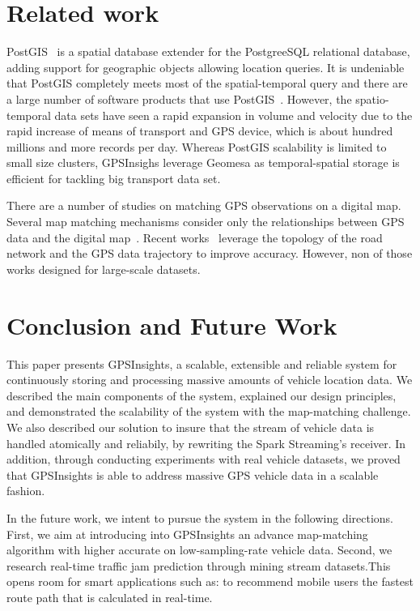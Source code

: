 \documentclass{acm_proc_article-sp}
\begin{document}
\section{Related work}

PostGIS~\cite{posgis} is a spatial database extender for the PostgreeSQL relational database, adding support for geographic objects allowing location queries. It is undeniable that PostGIS completely meets most of the spatial-temporal query and there are a large number of software products that use PostGIS~\cite{backendposgis}. However, the spatio-temporal data sets have seen a rapid expansion in volume and velocity due to the rapid increase of means of transport and GPS device, which is about hundred millions and more records per day. Whereas PostGIS scalability is limited to small size clusters, GPSInsighs leverage Geomesa as temporal-spatial storage is efficient for tackling big transport data set.

There are a number of studies on matching GPS observations on a digital map. Several map matching mechanisms consider only the relationships between GPS data and the digital map~\cite{noh1998map}. Recent works~\cite{yang2005map} leverage the topology of the road network and the GPS data trajectory to improve accuracy. However, non of those works designed for large-scale datasets.  

\section{Conclusion and Future Work}

This paper presents GPSInsights, a scalable, extensible and reliable system for continuously storing and processing massive amounts of vehicle location data. We described the main components of the system, explained our design principles, and demonstrated the scalability of the system with the map-matching challenge. We also described our solution to insure that the stream of vehicle data is handled atomically and reliabily, by rewriting the Spark Streaming's receiver. In addition, through conducting experiments with real vehicle datasets, we proved that GPSInsights is able to address massive GPS vehicle data in a scalable fashion.

In the future work, we intent to pursue the system in the following directions. First, we aim at introducing into GPSInsights an advance map-matching algorithm with higher accurate on low-sampling-rate vehicle data. Second, we research real-time traffic jam prediction through mining stream datasets.This opens room for smart applications such as: to recommend mobile users the fastest route path that is calculated in real-time.
%

%
%
\appendix \label{appendix}
\end{document}
